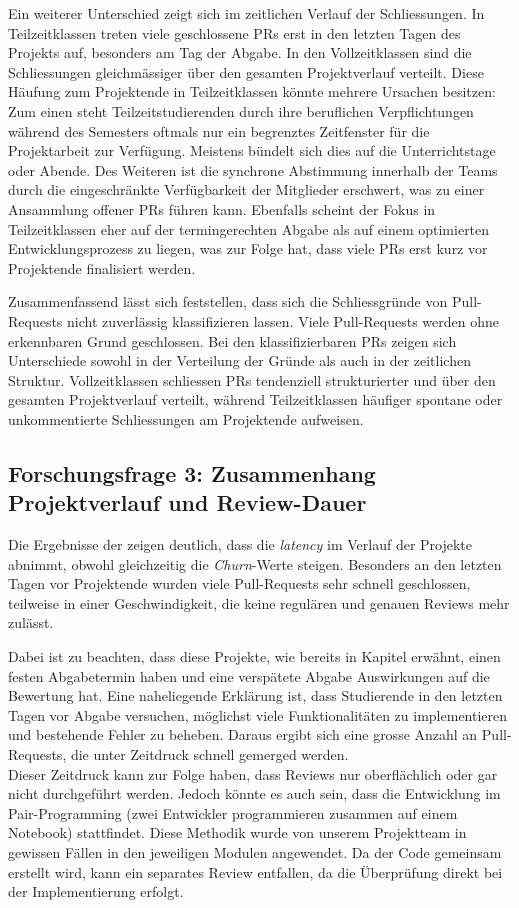 Ein weiterer Unterschied zeigt sich im zeitlichen Verlauf der Schliessungen. In Teilzeitklassen treten viele geschlossene PRs erst in den letzten Tagen des Projekts auf, besonders am Tag der Abgabe. In den Vollzeitklassen sind die Schliessungen gleichmässiger über den gesamten Projektverlauf verteilt.
Diese Häufung zum Projektende in Teilzeitklassen könnte mehrere Ursachen besitzen: Zum einen steht Teilzeitstudierenden durch ihre beruflichen Verpflichtungen während des Semesters oftmals nur ein begrenztes Zeitfenster für die Projektarbeit zur Verfügung. Meistens bündelt sich dies auf die Unterrichtstage oder Abende. Des Weiteren ist die synchrone Abstimmung innerhalb der Teams durch die eingeschränkte Verfügbarkeit der Mitglieder erschwert, was zu einer Ansammlung offener PRs führen kann. Ebenfalls scheint der Fokus in Teilzeitklassen eher auf der termingerechten Abgabe als auf einem optimierten Entwicklungsprozess zu liegen, was zur Folge hat, dass viele PRs erst kurz vor Projektende finalisiert werden.

Zusammenfassend lässt sich feststellen, dass sich die Schliessgründe von Pull-Re\-quests nicht zuverlässig klassifizieren lassen. Viele Pull-Requests werden ohne erkennbaren Grund geschlossen. Bei den klassifizierbaren PRs zeigen sich Unterschiede sowohl in der Verteilung der Gründe als auch in der zeitlichen Struktur. Vollzeitklassen schliessen PRs tendenziell strukturierter und über den gesamten Projektverlauf verteilt, während Teilzeitklassen häufiger spontane oder unkommentierte Schliessungen am Projektende aufweisen.


\subsection{Forschungsfrage 3: Zusammenhang Projektverlauf und Review-Dauer}
Die Ergebnisse der  zeigen deutlich, dass die \textit{latency} im Verlauf der Projekte abnimmt, obwohl gleichzeitig die \textit{Churn}-Werte steigen. Besonders an den letzten Tagen vor Projektende wurden viele Pull-Requests sehr schnell geschlossen, teilweise in einer Geschwindigkeit, die keine regulären und genauen Reviews mehr zulässt. 

Dabei ist zu beachten, dass diese Projekte, wie bereits in Kapitel  erwähnt, einen festen Abgabetermin haben und eine verspätete Abgabe Auswirkungen auf die Bewertung hat. Eine naheliegende Erklärung ist, dass Studierende in den letzten Tagen vor Abgabe versuchen, möglichst viele Funktionalitäten zu implementieren und bestehende Fehler zu beheben. Daraus ergibt sich eine grosse Anzahl an Pull-Requests, die unter Zeitdruck schnell gemerged werden. \\
Dieser Zeitdruck kann zur Folge haben, dass Reviews nur oberflächlich oder gar nicht durchgeführt werden. Jedoch könnte es auch sein, dass die Entwicklung im Pair-Programming (zwei Entwickler programmieren zusammen auf einem Notebook) stattfindet. Diese Methodik wurde von unserem Projektteam in gewissen Fällen in den jeweiligen Modulen angewendet. Da der Code gemeinsam erstellt wird, kann ein separates Review entfallen, da die Überprüfung direkt bei der Implementierung erfolgt.


